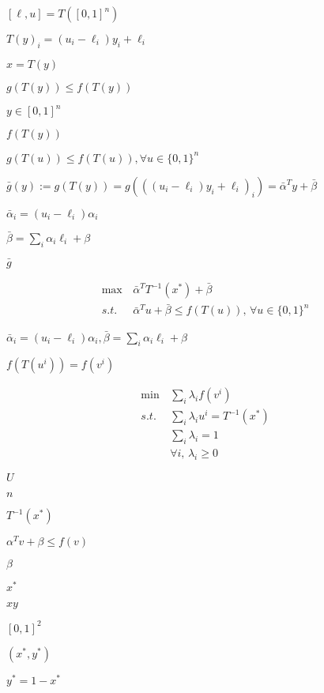 \documentclass{article}
\begin{document}
$ [\ell,u] = T([0, 1]^n) $
\pagebreak

$ T(y)_i = (u_i - \ell_i) y_i + \ell_i $
\pagebreak

$ x = T(y) $
\pagebreak

$
g(T(y)) \le f(T(y)) $
\pagebreak

$ y \in [0, 1]^n $
\pagebreak

$ f(T(y)) $
\pagebreak

$ g(T(u)) \leq f(T(u)), \forall u \in \{0, 1\}^n
$
\pagebreak

$ \bar g(y) := g(T(y)) = g(((u_i - \ell_i) y_i + \ell_i)_i) = \bar \alpha^T y + \bar \beta
$
\pagebreak

$ \bar \alpha_i = (u_i - \ell_i) \alpha_i $
\pagebreak

$ \bar \beta = \sum_i \alpha_i \ell_i + \beta $
\pagebreak

$ \bar g $
\pagebreak

\begin{align*}
             \max \, & \bar \alpha^T T^{-1}(x^*) + \bar \beta \\
    s.t. \; & \bar \alpha^T u + \bar \beta \le f(T(u)), \, \forall u \in \{0, 1\}^n
\end{align*}
\pagebreak

$ \bar \alpha_i = (u_i - \ell_i) \alpha_i, \bar \beta = \sum_i \alpha_i \ell_i +
\beta $
\pagebreak

$ f(T(u^i)) = f(v^i) $
\pagebreak

\begin{align*}
             \min \, & \sum_i \lambda_i f(v^i) \\
    s.t. \; & \sum_i \lambda_i u^i = T^{-1}(x^*) \\
            & \sum_i \lambda_i = 1 \\
            & \forall i, \, \lambda_i \geq 0
\end{align*}
\pagebreak

$ U $
\pagebreak

$n$
\pagebreak

$ T^{-1}(x^*) $
\pagebreak

$ \alpha^T v + \beta \le f(v) $
\pagebreak

$
 \beta $
\pagebreak

$ x^* $
\pagebreak

$ x y $
\pagebreak

$
[0,1]^2 $
\pagebreak

$ (x^*, y^*) $
\pagebreak

$ y^* = 1 - x^* $
\pagebreak
\end{document}
